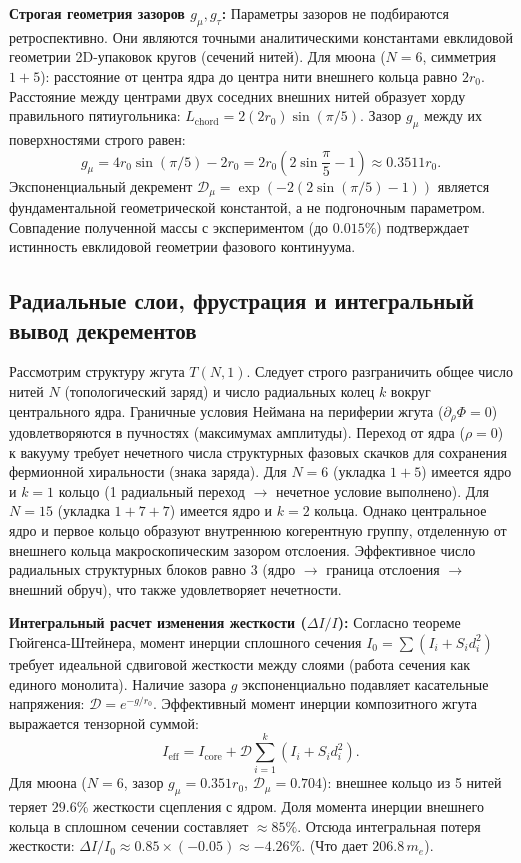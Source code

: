 \documentclass[11pt,a4paper]{article}
\begin{document}
\textbf{Строгая геометрия зазоров $g_\mu, g_\tau$:}
Параметры зазоров не подбираются ретроспективно. Они являются точными аналитическими константами евклидовой геометрии 2D-упаковок кругов (сечений нитей).
Для мюона ($N=6$, симметрия $1+5$): расстояние от центра ядра до центра нити внешнего кольца равно $2r_0$. Расстояние между центрами двух соседних внешних нитей образует хорду правильного пятиугольника: $L_{\text{chord}} = 2 (2r_0) \sin(\pi/5)$. Зазор $g_\mu$ между их поверхностями строго равен:
\begin{equation}
g_\mu = 4r_0 \sin(\pi/5) - 2r_0 = 2r_0 \left( 2\sin\frac{\pi}{5} - 1 \right) \approx 0.3511 r_0.
\end{equation}
Экспоненциальный декремент $\mathcal{D}_\mu = \exp(-2(2\sin(\pi/5)-1))$ является фундаментальной геометрической константой, а не подгоночным параметром. Совпадение полученной массы с экспериментом (до $0.015\%$) подтверждает истинность евклидовой геометрии фазового континуума.

\subsection{Радиальные слои, фрустрация и интегральный вывод декрементов}
Рассмотрим структуру жгута $T(N,1)$. Следует строго разграничить общее число нитей $N$ (топологический заряд) и число радиальных колец $k$ вокруг центрального ядра. 
Граничные условия Неймана на периферии жгута ($\partial_\rho \Phi = 0$) удовлетворяются в пучностях (максимумах амплитуды). Переход от ядра ($\rho=0$) к вакууму требует нечетного числа структурных фазовых скачков для сохранения фермионной хиральности (знака заряда).
Для $N=6$ (укладка $1+5$) имеется ядро и $k=1$ кольцо (1 радиальный переход $\to$ нечетное условие выполнено).
Для $N=15$ (укладка $1+7+7$) имеется ядро и $k=2$ кольца. Однако центральное ядро и первое кольцо образуют внутреннюю когерентную группу, отделенную от внешнего кольца макроскопическим зазором отслоения. Эффективное число радиальных структурных блоков равно 3 (ядро $\to$ граница отслоения $\to$ внешний обруч), что также удовлетворяет нечетности.

\textbf{Интегральный расчет изменения жесткости ($\Delta I/I$):}
Согласно теореме Гюйгенса-Штейнера, момент инерции сплошного сечения $I_0 = \sum (I_i + S_i d_i^2)$ требует идеальной сдвиговой жесткости между слоями (работа сечения как единого монолита). Наличие зазора $g$ экспоненциально подавляет касательные напряжения: $\mathcal{D} = e^{-g/r_0}$. Эффективный момент инерции композитного жгута выражается тензорной суммой:
\begin{equation}
I_{\text{eff}} = I_{\text{core}} + \mathcal{D} \sum_{i=1}^{k} \left( I_i + S_i d_i^2 \right).
\end{equation}
Для мюона ($N=6$, зазор $g_\mu = 0.351 r_0$, $\mathcal{D}_\mu = 0.704$): внешнее кольцо из 5 нитей теряет $29.6\%$ жесткости сцепления с ядром. Доля момента инерции внешнего кольца в сплошном сечении составляет $\approx 85\%$. Отсюда интегральная потеря жесткости: $\Delta I / I_0 \approx 0.85 \times (-0.05) \approx -4.26\%$. (Что дает $206.8 \, m_e$).
\end{document}
